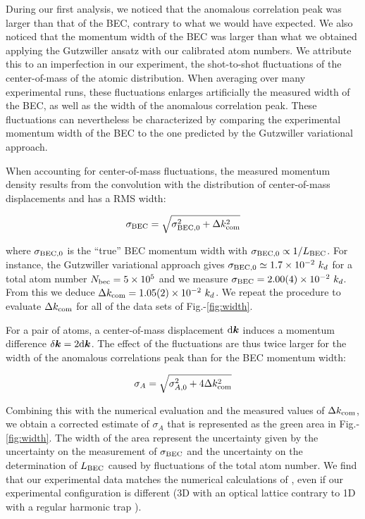 During our first analysis, we noticed that the anomalous correlation peak was larger than that of the BEC, contrary to what we would have expected. We also noticed that the momentum width of the BEC was larger than what we obtained applying the Gutzwiller ansatz with our calibrated atom numbers. We attribute this to an imperfection in our experiment, the shot-to-shot fluctuations of the center-of-mass of the atomic distribution. When averaging over many experimental runs, these fluctuations enlarges artificially the measured width of the BEC, as well as the width of the anomalous correlation peak. These fluctuations can nevertheless be characterized by comparing the experimental momentum width of the BEC to the one predicted by the Gutzwiller variational approach.

When accounting for center-of-mass fluctuations, the measured momentum density results from the convolution with the distribution of center-of-mass displacements and has a RMS width:

\begin{equation}
    \sigma_{\rm{BEC}}=\sqrt{\sigma_{\rm{BEC},0}^2+\Delta k_{\rm{com}}^2}
\end{equation}

\noindent where $\sigma_{\rm{BEC},0}$ is the ``true'' BEC momentum width with $\sigma_{\rm{BEC},0} \propto 1/L_{\rm{BEC}}$. For instance, the Gutzwiller variational approach gives  $\sigma_{\rm{BEC},0} \simeq 1.7 \times 10^{-2} \ k_d$ for a total atom number $N_{\rm{bec}} = 5 \times 10^5$ and we measure $\sigma_{\rm BEC} = 2.00(4) \times 10^{-2} \ k_d$. From this we deduce $\Delta k_{\rm{com}}=1.05(2) \times 10^{-2} \ k_d$. We repeat the procedure to evaluate $\Delta k_{\rm{com}}$ for all of the data sets of Fig.-\ref{fig:width}.

For a \kmk pair of atoms, a center-of-mass displacement ${\rm{d}} \bm{k}$ induces a momentum difference $\delta \bm{k}=2 {\rm{d}} \bm{k}$. The effect of the fluctuations are thus twice larger for the width of the anomalous correlations peak than for the BEC momentum width:

\begin{equation}
    \sigma_A = \sqrt{\sigma_{A,0}^2+4\Delta k_{\rm{com}}^2}
\end{equation}

\noindent Combining this with the numerical evaluation and the measured values of $\Delta k_{\rm{com}}$, we obtain a corrected estimate of $\sigma_A$ that is represented as the green area in Fig.-\ref{fig:width}. The width of the area represent the uncertainty given by the uncertainty on the measurement of $\sigma_{\rm{BEC}}$ and the uncertainty on the determination of $L_{\rm BEC}$ caused by fluctuations of the total atom number. We find that our experimental data matches the numerical calculations of \cite{butera2020}, even if our experimental configuration is different (3D with an optical lattice contrary to 1D with a regular harmonic trap \cite{butera2020}).

